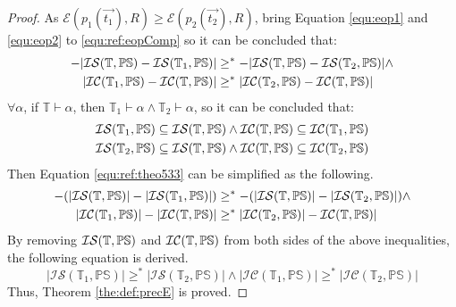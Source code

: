 \documentclass[11pt,letterpaper]{article}
\newcommand{\theory}{\mathbb{T}}
\newcommand{\struc}{\mathbb{PS}}
\newcommand{\incompa}{{\cal IC}(\theory,\struc)}
\newcommand{\insuffa}{{\cal IS}(\theory,\struc)}
\begin{document}
\begin{proof}
 As $\mathcal{E}(p_1(\vec{t_1}), R) \geq\mathcal{E}(p_2(\vec{t_2}), R)$, bring Equation \ref{equ:eop1} and \ref{equ:eop2} to \ref{equ:ref:eopComp} so it can be concluded that:
 \begin{equation}\label{equ:ref:theo533}
 \begin{aligned}
     -|\insuffa - \mathcal{IS}(\theory_1, \mathbb{PS}) | &\geq^*
      -|\insuffa - \mathcal{IS}(\theory_2, \mathbb{PS}) | \wedge \\
     |\mathcal{IC}(\theory_1, \mathbb{PS}) - \incompa| &\geq^*
      |\mathcal{IC}(\theory_2, \mathbb{PS}) -  \incompa|
 \end{aligned}
 \end{equation}
$\forall \alpha$, if $\theory \vdash \alpha$, then $\theory_1 \vdash \alpha \wedge \theory_2 \vdash \alpha $, so it can be concluded that:
\begin{equation}\label{equ:ref:530}
\begin{aligned}
    \mathcal{IS}(\theory_1, \mathbb{PS}) \subseteq \insuffa \wedge \incompa \subseteq  \mathcal{IC}(\theory_1, \mathbb{PS}) \\
  \mathcal{IS}(\theory_2, \mathbb{PS}) \subseteq \insuffa  \wedge \incompa \subseteq \mathcal{IC}(\theory_2, \mathbb{PS}) 
\end{aligned}
 \end{equation}
Then Equation \ref{equ:ref:theo533} can be simplified as the following.
\begin{equation}\label{equ:ref:theo5332}
 \begin{aligned}
     -(|\insuffa| - |\mathcal{IS}(\theory_1, \mathbb{PS}) |) &\geq^*
      -(|\insuffa| - |\mathcal{IS}(\theory_2, \mathbb{PS}) | )\wedge \\
     |\mathcal{IC}(\theory_1, \mathbb{PS})| - |\incompa| &\geq^*
      |\mathcal{IC}(\theory_2, \mathbb{PS})| -  \incompa|
 \end{aligned}
 \end{equation}
By removing $\insuffa$ and $\incompa$ from both sides of the above inequalities, the following equation is derived.
 \begin{equation}
     |\mathcal{IS}(\theory_1, \mathbb{PS})|  \geq^*
      |\mathcal{IS}(\theory_2, \mathbb{PS})| \wedge 
     |\mathcal{IC}(\theory_1, \mathbb{PS})| \geq^*
      |\mathcal{IC}(\theory_2, \mathbb{PS})| 
 \end{equation}
 Thus, Theorem \ref{the:def:precE} is proved.
\end{proof}
\end{document}

